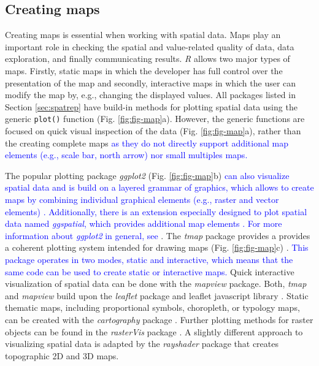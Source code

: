 \documentclass[smallextended]{svjour3}       %
\begin{document}
\hypertarget{creating-maps}{%
\subsection{Creating maps}\label{creating-maps}}

Creating maps is essential when working with spatial data.
Maps play an important role in checking the spatial and value-related quality of data, data exploration, and finally communicating results.
\textit{R} allows two major types of maps.
Firstly, static maps in which the developer has full control over the presentation of the map and secondly, interactive maps in which the user can modify the map by, e.g., changing the displayed values.
All packages listed in Section \ref{sec:spatrep} have build-in methods for plotting spatial data using the generic \texttt{plot()} function (Fig. \ref{fig:fig-map}a).
However, the generic functions are focused on quick visual inspection of the data (Fig. \ref{fig:fig-map}a), rather than the creating complete maps \textcolor{blue}{as they do not directly support additional map elements (e.g., scale bar, north arrow) nor small multiples maps.}

The popular plotting package \textit{ggplot2} (Fig. \ref{fig:fig-map}b) \textcolor{blue}{can also visualize spatial data and is build on a layered grammar of graphics, which allows to create maps by combining individual graphical elements (e.g., raster and vector elements) \cite{Wickham2016}.
Additionally, there is an extension especially designed to plot spatial data named \textit{ggspatial}, which provides additional map elements \cite{Dunnington2020}.
For more information about \textit{ggplot2} in general, see \cite{Wickham2016}}.
The \textit{tmap} package provides a provides a coherent plotting system intended for drawing maps (Fig. \ref{fig:fig-map}c) \cite{Tennekes2018}.
\textcolor{blue}{This package operates in two modes, static and interactive, which means that the same code can be used to create static or interactive maps.}
Quick interactive visualization of spatial data can be done with the \textit{mapview} package\cite{Appelhans2020}.
Both, \textit{tmap} and \textit{mapview} build upon the \textit{leaflet} package and leaflet javascript library \cite{Cheng2021}.
Static thematic maps, including proportional symbols, choropleth, or typology maps, can be created with the \textit{cartography} package \cite{Giraud2016}.
Further plotting methods for raster objects can be found in the \textit{rasterVis} package \cite{Lamigueiro2020}.
A slightly different approach to visualizing spatial data is adapted by the \textit{rayshader} package \cite{Morgen-Wall2020} that creates topographic 2D and 3D maps.
\end{document}
